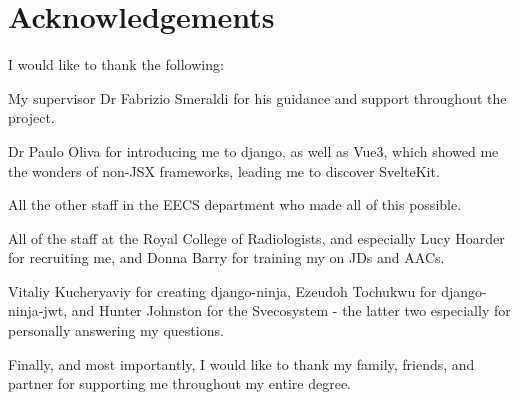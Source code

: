 \chapter*{\centering Acknowledgements}

I would like to thank the following:

My supervisor Dr Fabrizio Smeraldi for his guidance and support throughout the project.

Dr Paulo Oliva for introducing me to django, as well as Vue3, which showed me the wonders of non-JSX frameworks, leading me to discover SvelteKit. 

All the other staff in the EECS department who made all of this possible. 

All of the staff at the Royal College of Radiologists, and especially Lucy Hoarder for recruiting me, and Donna Barry for training my on JDs and AACs.

Vitaliy Kucheryaviy for creating django-ninja, Ezeudoh Tochukwu for django-ninja-jwt, and Hunter Johnston for the Svecosystem - the latter two especially for personally answering my questions.

Finally, and most importantly, I would like to thank my family, friends, and partner for supporting me throughout my entire degree.

